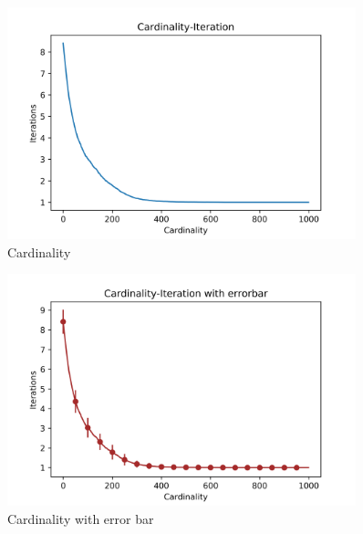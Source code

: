 \documentclass[a4paper,12pt]{article}
\begin{document}
	\begin{figure}[H]
		\centering
		\includegraphics[width=0.9\textwidth]{Card50_4_1000_100}
		\caption{Cardinality}\label{Card50_4_1000_100}
	\end{figure}
	\begin{figure}[H]
		\centering
		\includegraphics[width=0.9\textwidth]{CardErr50_4_1000_100}
		\caption{Cardinality with error bar}\label{CardErr50_4_1000_100}
	\end{figure}
\end{document}
